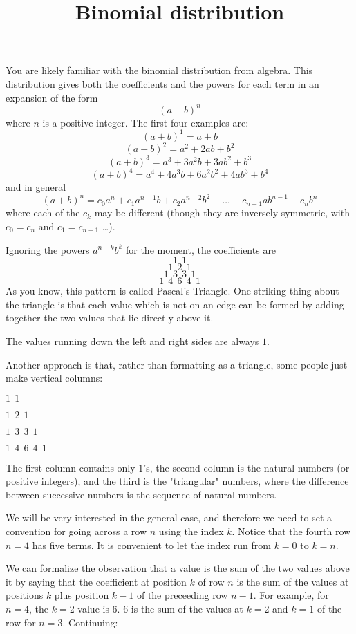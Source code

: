\documentclass[11pt, oneside]{article}
\title{Binomial distribution}
\date{}
\begin{document}
\maketitle
\Large


\label{sec:binomial}

You are likely familiar with the binomial distribution from algebra.  This distribution gives both the coefficients and the powers for each term in an expansion of the form
\[ (a+b)^n \]
where $n$ is a positive integer.  The first four examples are:
\[ (a+b)^1 = a + b \]
\[ (a+b)^2 = a^2 + 2ab + b^2 \]
\[ (a+b)^3 = a^3 + 3a^2b + 3ab^2 + b^3 \]
\[ (a+b)^4 = a^4 + 4a^3b + 6a^2b^2 + 4ab^3 + b^4 \]
and in general
\[ (a+b)^n = c_0a^n + c_1a^{n-1}b + c_2a^{n-2}b^2 + \dots + c_{n-1}ab^{n-1} + c_nb^n \]
where each of the $c_k$ may be different (though they are inversely symmetric, with $c_0 = c_n$ and $c_1 = c_{n-1}$ \dots).

Ignoring the powers $a^{n-k}b^k$ for the moment, the coefficients are
\[ 1 \ \ 1 \]
\[ 1 \ \ 2 \ \ 1 \]
\[ 1 \ \ 3 \ \ 3 \ \ 1 \]
\[ 1 \ \ 4 \ \ 6 \ \ 4 \ \ 1 \]
As you know, this pattern is called Pascal's Triangle.  One striking thing about the triangle is that each value which is not on an edge can be formed by adding together the two values that lie directly above it.

The values running down the left and right sides are always $1$.

Another approach is that, rather than formatting as a triangle, some people just make vertical columns:

$1 \ \ 1$

$1 \ \ 2 \ \ 1$

$1 \ \ 3 \ \ 3 \ \ 1$

$1 \ \ 4 \ \ 6 \ \ 4 \ \ 1$

The first column contains only $1$'s, the second column is the natural numbers (or positive integers), and the third is the "triangular" numbers, where the difference between successive numbers is the sequence of natural numbers.

We will be very interested in the general case, and therefore we need to set a convention for going across a row $n$ using the index $k$.  Notice that the fourth row $n = 4$ has five terms.  It is convenient to let the index run from $k=0$ to $k = n$.

We can formalize the observation that a value is the sum of the two values above it by saying that the coefficient at position $k$ of row $n$ is the sum of the values at positions $k$ plus position $k-1$ of the preceeding row $n-1$.  For example, for $n=4$, the $k=2$ value is $6$.  $6$ is the sum of the values at $k=2$ and $k=1$ of the row for $n=3$.  Continuing:
\end{document}
